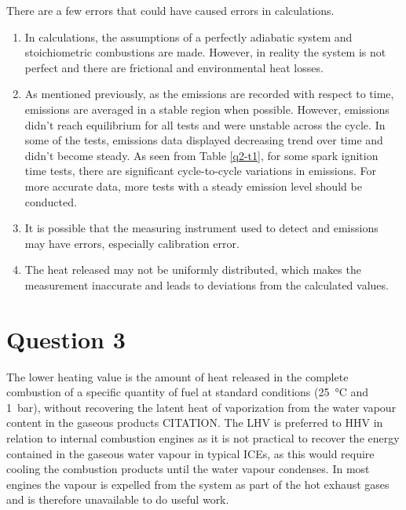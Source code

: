 \documentclass[11pt]{article}
\begin{document}
There are a few errors that could have caused errors in calculations.
\begin{enumerate}
    \item In calculations, the assumptions of a perfectly adiabatic system and stoichiometric combustions are made. However, in reality the system is not perfect and there are frictional and environmental heat losses. 
    \item As mentioned previously, as the emissions are recorded with respect to time, emissions are averaged in a stable region when possible. However, emissions didn’t reach equilibrium for all tests and were unstable across the cycle. In some of the tests, emissions data displayed decreasing trend over time and didn’t become steady. As seen from Table \ref{q2-t1}, for some spark ignition time tests, there are significant cycle-to-cycle variations in emissions. For more accurate data, more tests with a steady emission level should be conducted. 
    \item It is possible that the measuring instrument used to detect  and  emissions may have errors, especially calibration error.
    \item The heat released may not be uniformly distributed, which makes the measurement inaccurate and leads to deviations from the calculated values. 
\end{enumerate}
\section{Question 3}
The lower heating value is the amount of heat released in the complete combustion of a specific quantity of fuel at standard conditions (\SI{25}{\celsius} and \SI{1}{\bar}), without recovering the latent heat of vaporization from the water vapour content in the gaseous products CITATION. The LHV is preferred to HHV in relation to internal combustion engines as it is not practical to recover the energy contained in the gaseous water vapour in typical ICEs, as this would require cooling the combustion products until the water vapour condenses. In most engines the vapour is expelled from the system as part of the hot exhaust gases and is therefore unavailable to do useful work. 
\end{document}
